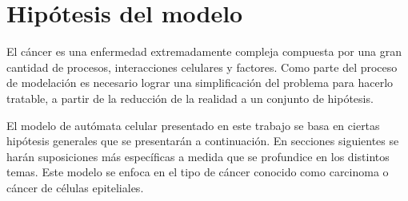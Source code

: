 \section{Hip\'otesis del modelo}
\label{subsec-hipo}
El c\'ancer es una enfermedad extremadamente compleja compuesta por una gran cantidad de procesos, interacciones celulares y factores. Como parte del proceso de modelación es necesario lograr una simplificación del problema para hacerlo tratable, a partir de la reducción de la realidad a un conjunto de hipótesis.

El modelo de autómata celular presentado en este trabajo se basa en ciertas hipótesis generales que se presentarán a continuación. En secciones siguientes se harán suposiciones más específicas a medida que se profundice en los distintos temas. Este modelo se enfoca en el tipo de cáncer conocido como carcinoma o cáncer de células epiteliales.


